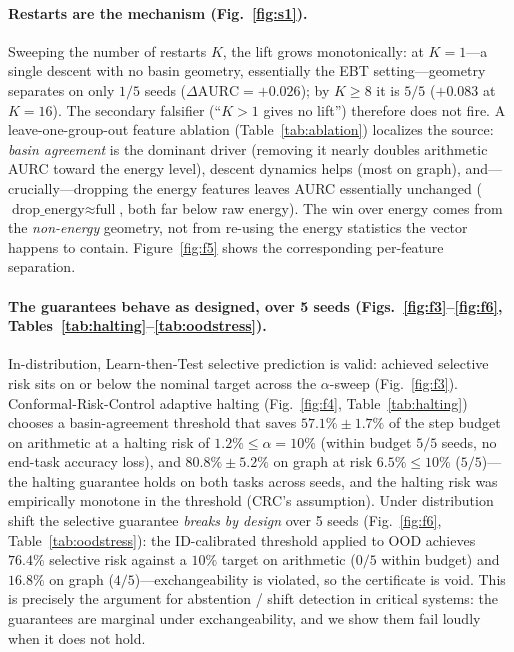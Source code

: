 \paragraph{Restarts are the mechanism (Fig.~\ref{fig:s1}).} Sweeping the number of restarts $K$, the
lift grows monotonically: at $K{=}1$---a single descent with no basin geometry, essentially the EBT
setting---geometry separates on only $1/5$ seeds ($\Delta\mathrm{AURC}=+0.026$); by $K{\ge}8$ it is
$5/5$ ($+0.083$ at $K{=}16$). The secondary falsifier (``$K{>}1$ gives no lift'') therefore does not
fire. A leave-one-group-out feature ablation (Table~\ref{tab:ablation}) localizes the source:
\emph{basin agreement} is the dominant driver (removing it nearly doubles arithmetic AURC toward the
energy level), descent dynamics helps (most on graph), and---crucially---dropping the energy
features leaves AURC essentially unchanged ($\text{drop\_energy}\approx\text{full}$, both far below
raw energy). The win over energy comes from the \emph{non-energy} geometry, not from re-using the
energy statistics the vector happens to contain. Figure~\ref{fig:f5} shows the corresponding
per-feature separation.

\paragraph{The guarantees behave as designed, over 5 seeds (Figs.~\ref{fig:f3}--\ref{fig:f6},
Tables~\ref{tab:halting}--\ref{tab:oodstress}).} In-distribution, Learn-then-Test selective
prediction is valid: achieved selective risk sits on or below the nominal target across the
$\alpha$-sweep (Fig.~\ref{fig:f3}). Conformal-Risk-Control adaptive halting
(Fig.~\ref{fig:f4}, Table~\ref{tab:halting}) chooses a basin-agreement threshold that saves
$57.1\%\pm1.7\%$ of the step budget on arithmetic at a halting risk of $1.2\% \le \alpha{=}10\%$
(within budget $5/5$ seeds, no end-task accuracy loss), and $80.8\%\pm5.2\%$ on graph at risk
$6.5\% \le 10\%$ ($5/5$)---the halting guarantee holds on both tasks across seeds, and the halting
risk was empirically monotone in the threshold (CRC's assumption). Under distribution shift the
selective guarantee \emph{breaks by design} over 5 seeds (Fig.~\ref{fig:f6},
Table~\ref{tab:oodstress}): the ID-calibrated threshold applied to OOD achieves $76.4\%$ selective
risk against a $10\%$ target on arithmetic ($0/5$ within budget) and $16.8\%$ on graph
($4/5$)---exchangeability is violated, so the certificate is void. This is precisely the argument for
abstention / shift detection in critical systems: the guarantees are marginal under exchangeability,
and we show them fail loudly when it does not hold.

